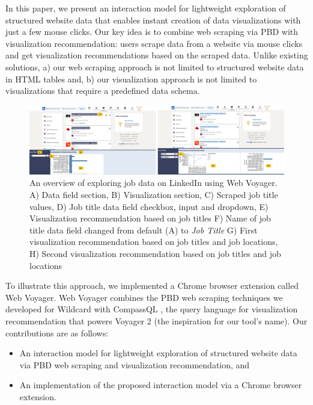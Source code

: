 \documentclass{vgtc}                          %
\begin{document}
In this paper, we present an interaction model for lightweight exploration of structured website data that enables instant creation
of data visualizations with just a few mouse clicks. Our key idea is to combine web scraping via PBD with visualization recommendation:
users scrape data from a website via mouse clicks and get visualization recommendations based on the scraped data. Unlike existing solutions,
a) our web scraping approach is not limited to structured website data in HTML tables and, b) our visualization approach is not limited to
visualizations that require a predefined data schema.

\begin{figure}
  \includegraphics[width=\textwidth]{figures/example}
  \caption{\label{fig:example}An overview of exploring job data on LinkedIn using Web Voyager. 
  A) Data field section,
  B) Visualization section,
  C) Scraped job title values,
  D) Job title data field checkbox, input and dropdown,
  E) Visualization recommendation based on job titles
  F) Name of job title data field changed from default (A) to \emph{Job Title}
  G) First visualization recommendation based on job titles and job locations,
  H) Second visualization recommendation based on job titles and job locations}
  \label{fig:example}
\end{figure}

To illustrate this approach, we implemented a Chrome browser extension called Web Voyager. Web Voyager combines the PBD web scraping
techniques we developed for Wildcard \cite{litt2020} with CompassQL \cite{wongsuphasawat2016}, the query language for visualization
recommendation that powers Voyager 2 \cite{wongsuphasawat2017} (the inspiration for our tool’s name). Our contributions are as follows:

\begin{itemize}
 \item An interaction model for lightweight exploration of structured website data via PBD web scraping and visualization recommendation, and
 \item An implementation of the proposed interaction model via a Chrome browser extension.
\end{itemize}
\end{document}
